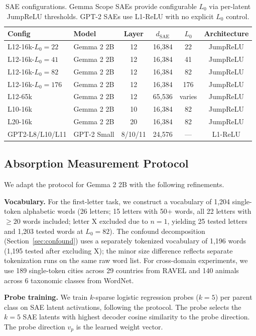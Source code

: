 \documentclass{article}
\begin{document}
\begin{table}[t]
\caption{SAE configurations. Gemma Scope SAEs provide configurable $L_0$ via per-latent JumpReLU thresholds. GPT-2 SAEs use L1-ReLU with no explicit $L_0$ control.}
\label{tab:configs}
\centering
\small
\begin{tabular}{llcccc}
\toprule
Config & Model & Layer & $d_{\text{SAE}}$ & $L_0$ & Architecture \\
\midrule
L12-16k-$L_0{=}22$ & Gemma 2 2B & 12 & 16,384 & 22 & JumpReLU \\
L12-16k-$L_0{=}41$ & Gemma 2 2B & 12 & 16,384 & 41 & JumpReLU \\
L12-16k-$L_0{=}82$ & Gemma 2 2B & 12 & 16,384 & 82 & JumpReLU \\
L12-16k-$L_0{=}176$ & Gemma 2 2B & 12 & 16,384 & 176 & JumpReLU \\
L12-65k & Gemma 2 2B & 12 & 65,536 & varies & JumpReLU \\
L10-16k & Gemma 2 2B & 10 & 16,384 & 82 & JumpReLU \\
L20-16k & Gemma 2 2B & 20 & 16,384 & 82 & JumpReLU \\
GPT2-L8/L10/L11 & GPT-2 Small & 8/10/11 & 24,576 & --- & L1-ReLU \\
\bottomrule
\end{tabular}
\end{table}

\subsection{Absorption Measurement Protocol}

We adapt the \citet{chanin2024absorption} protocol for Gemma 2 2B with the following refinements.

\textbf{Vocabulary.} For the first-letter task, we construct a vocabulary of 1,204 single-token alphabetic words (26 letters; 15 letters with 50+ words, all 22 letters with $\geq 20$ words included; letter X excluded due to $n = 1$, yielding 25 tested letters and 1,203 tested words at $L_0{=}82$). The confound decomposition (Section~\ref{sec:confound}) uses a separately tokenized vocabulary of 1,196 words (1,195 tested after excluding X); the minor size difference reflects separate tokenization runs on the same raw word list. For cross-domain experiments, we use 189 single-token cities across 29 countries from RAVEL \citep{huang2024ravel} and 140 animals across 6 taxonomic classes from WordNet.

\textbf{Probe training.} We train $k$-sparse logistic regression probes ($k = 5$) per parent class on SAE latent activations, following the \citet{chanin2024absorption} protocol. The probe selects the $k = 5$ SAE latents with highest decoder cosine similarity to the probe direction. The probe direction $v_p$ is the learned weight vector.
\end{document}
